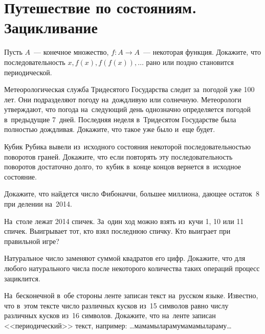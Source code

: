 
\section*{Путешествие по состояниям. Зацикливание}


\begin{problems}

\item
Пусть $A$~--- конечное множество, $f \colon A \to A$~--- некоторая функция.
Докажите, что последовательность $x, f(x), f(f(x)), \ldots$ рано или поздно
становится периодической.

\item
Метеорологическая служба Тридесятого Государства следит за~погодой уже 100 лет.
Они подразделяют погоду на~дождливую или солнечную.
Метеорологи утверждают, что погода на~следующий день однозначно определяется
погодой в~предыдущие 7~дней.
Последняя неделя в~Тридесятом Государстве была полностью дождливая.
Докажите, что такое уже было и~еще будет.

\item
Кубик Рубика вывели из~исходного состояния некоторой последовательностью
поворотов граней.
Докажите, что если повторять эту последовательность поворотов достаточно долго,
то~кубик в~конце концов вернется в~исходное состояние.

\item
Докажите, что найдется число Фибоначчи, большее миллиона, дающее остаток~8
при делении на~2014.

\item
На~столе лежат 2014 спичек.
За~один ход можно взять из~кучи 1, 10 или 11 спичек.
Выигрывает тот, кто взял последнюю спичку.
Кто выиграет при правильной игре?

\item
Натуральное число заменяют суммой квадратов его цифр.
Докажите, что для любого натурального числа после некоторого количества таких
операций процесс зациклится.

\item
На~бесконечной в~обе стороны ленте записан текст на~русском языке.
Известно, что в~этом тексте число различных кусков из~15 символов равно числу
различных кусков из~16 символов.
Докажите, что на~ленте записан <<периодический>> текст, например:
\textsf{\ldots{мамамыларамумамамылараму}\ldots}


\end{problems}

